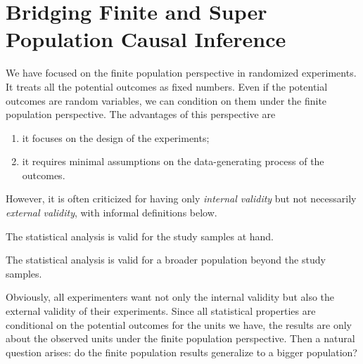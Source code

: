 \chapter{Bridging Finite and Super Population Causal Inference}\label{chapter::bridging}


 


We have focused on the finite population perspective in randomized experiments. It treats all the potential outcomes as fixed numbers. Even if the potential outcomes are random variables, we can condition on them under the finite population perspective. The advantages of this perspective are
\begin{enumerate}
\item
it focuses on the design of the experiments;
\item
it requires minimal assumptions on the data-generating process of the outcomes.
\end{enumerate}
However, it is often criticized for having only {\it  internal validity} but not necessarily {\it external validity}, with informal definitions below. 

\begin{definition}
The statistical analysis is valid for the study samples at hand. 
\end{definition}


\begin{definition}
The statistical analysis is valid for a broader population beyond the study samples. 
\end{definition}



Obviously, all experimenters want not only the internal validity but also the external validity of their experiments.  Since all statistical properties are conditional on the potential outcomes for the units we have, the results are only about the observed units under the finite population perspective. Then a natural question arises: do the finite population results generalize to a bigger population? 



